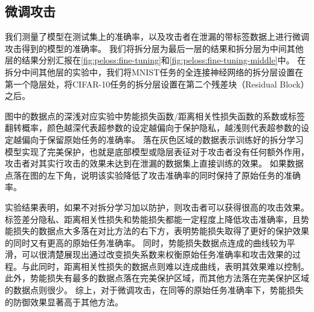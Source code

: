 \subsection{微调攻击}

我们测量了模型在测试集上的准确率，以及攻击者在泄漏的带标签数据上进行微调攻击得到的模型的准确率。
我们将拆分层为最后一层的结果和拆分层为中间其他层的结果分别汇报在\autoref{fig:peloss:fine-tuning}和\autoref{fig:peloss:fine-tuning-middle}中。
%
在拆分中间其他层的实验中，我们将MNIST任务的全连接神经网络的拆分层设置在第一个隐层处，将CIFAR-10任务的拆分层设置在第二个残差块（Residual Block）之后。

图中的数据点的深浅对应实验中势能损失函数/距离相关性损失函数的系数或标签翻转概率，颜色越深代表超参数的设定越偏向于保护隐私，越浅则代表超参数的设定越偏向于保留原始任务的准确率。
%
落在灰色区域的数据表示训练好的拆分学习模型实现了完美保护，也就是底部模型或隐层表征对于攻击者没有任何额外作用，攻击者对其实行攻击的效果未达到在泄漏的数据集上直接训练的效果。
%
如果数据点落在图的左下角，说明该实验降低了攻击准确率的同时保持了原始任务的准确率。

实验结果表明，如果不对拆分学习加以防护，则攻击者可以获得很高的攻击效果。
%
标签差分隐私、距离相关性损失和势能损失都能一定程度上降低攻击准确率，且势能损失的数据点大多落在对比方法的右下方，表明势能损失取得了更好的保护效果的同时又有更高的原始任务准确率。
%
同时，势能损失数据点连成的曲线较为平滑，可以很清楚展现出通过改变损失系数来权衡原始任务准确率和攻击效果的过程。与此同时，距离相关性损失的数据点则难以连成曲线，表明其效果难以控制。
%
此外，势能损失有最多的数据点落在完美保护区域，而其他方法落在完美保护区域的数据点则很少。
%
综上，对于微调攻击，在同等的原始任务准确率下，势能损失的防御效果显著高于其他方法。

